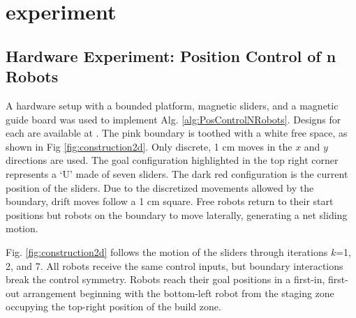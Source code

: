 
\section{experiment}\label{sec:expResults}

\subsection{Hardware Experiment: Position Control of n Robots}
A hardware setup with a bounded platform, magnetic sliders, and a magnetic guide board was used to implement  Alg. \ref{alg:PosControlNRobots}. 
  Designs for each are available at \cite{Arun2016Thingiverse}. 
  The pink boundary is toothed with a white free space, as shown in Fig \ref{fig:construction2d}.
    Only discrete, 1 cm moves in the $x$ and $y$ directions are used. The goal configuration highlighted in the top right corner represents a `U' made of seven sliders. The dark red configuration is the current position of the sliders. 
Due to the discretized movements allowed by the boundary, drift moves follow a 1 cm square.  Free robots return to their start positions but robots on the boundary to move laterally, generating a net sliding motion.

Fig. \ref{fig:construction2d} follows the motion of the sliders through iterations  $k$=1, 2, and 7. All robots receive the same control inputs, but boundary interactions break the control symmetry.  Robots reach their goal positions in a first-in, first-out arrangement beginning with the bottom-left robot from the staging zone occupying the top-right position of the build zone.

